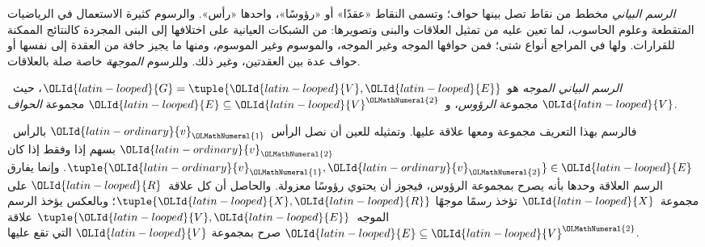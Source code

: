 \documentclass[../../../include/open-logic-section]{subfiles}
\begin{document}

\emph{الرسم البياني} مخطط من نقاط تصل بينها حواف؛ وتسمى النقاط
«عقدًا» أو «رؤوسًا»، واحدها «رأس». والرسوم كثيرة الاستعمال في
الرياضيات المتقطعة وعلوم الحاسوب، لما تعين عليه من تمثيل العلاقات
والبنى وتصويرها: من الشبكات العيانية على اختلافها إلى البنى المجردة
كالنتائج الممكنة للقرارات. ولها في المراجع أنواع شتى؛ فمن حوافها
الموجه وغير الموجه، والموسوم وغير الموسوم، ومنها ما يجيز حافة من
العقدة إلى نفسها أو حواف عدة بين العقدتين، وغير ذلك.
وللرسوم \emph{الموجهة} خاصة صلة بالعلاقات.

\begin{defn}
\emph{الرسم البياني الموجه} هو ${\OLId{latin-looped}{G}} = \tuple{{\OLId{latin-looped}{V}}, {\OLId{latin-looped}{E}}}$، حيث~${\OLId{latin-looped}{V}}$ مجموعة
\emph{الرؤوس}، و~${\OLId{latin-looped}{E}} \subseteq {\OLId{latin-looped}{V}}^{\OLMathNumeral{2}}$ مجموعة \emph{الحواف}.
\end{defn}

\begin{explain}
فالرسم بهذا التعريف مجموعة ومعها علاقة عليها. وتمثيله للعين أن
نصل الرأس~${\OLId{latin-ordinary}{v}}_{\OLMathNumeral{1}}$ بالرأس~${\OLId{latin-ordinary}{v}}_{\OLMathNumeral{2}}$ بسهم إذا وفقط إذا كان
$\tuple{{\OLId{latin-ordinary}{v}}_{\OLMathNumeral{1}}, {\OLId{latin-ordinary}{v}}_{\OLMathNumeral{2}}} \in {\OLId{latin-looped}{E}}$. وإنما يفارق الرسم العلاقة وحدها بأنه
يصرح بمجموعة الرؤوس، فيجوز أن يحتوي رؤوسًا معزولة. والحاصل أن كل
علاقة~${\OLId{latin-looped}{R}}$ على مجموعة~${\OLId{latin-looped}{X}}$ تؤخذ رسمًا موجهًا $\tuple{{\OLId{latin-looped}{X}}, {\OLId{latin-looped}{R}}}$؛ وبالعكس
يؤخذ الرسم الموجه~$\tuple{{\OLId{latin-looped}{V}}, {\OLId{latin-looped}{E}}}$ علاقة ${\OLId{latin-looped}{E}} \subseteq {\OLId{latin-looped}{V}}^{\OLMathNumeral{2}}$ صرح
بمجموعة ${\OLId{latin-looped}{V}}$ التي تقع عليها.
\end{explain}
\end{document}
